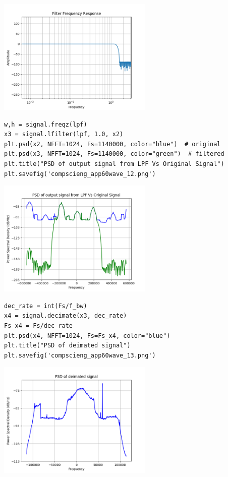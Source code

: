 \documentclass[12pt,fleqn]{article}\usepackage{../../common}
\begin{document}
\includegraphics[width=20em]{compscieng_app60wave_11.png}


\begin{verbatim}
w,h = signal.freqz(lpf)
x3 = signal.lfilter(lpf, 1.0, x2)
plt.psd(x2, NFFT=1024, Fs=1140000, color="blue")  # original
plt.psd(x3, NFFT=1024, Fs=1140000, color="green")  # filtered
plt.title("PSD of output signal from LPF Vs Original Signal")
plt.savefig('compscieng_app60wave_12.png')
\end{verbatim}

\includegraphics[width=20em]{compscieng_app60wave_12.png}

\begin{verbatim}
dec_rate = int(Fs/f_bw)
x4 = signal.decimate(x3, dec_rate)
Fs_x4 = Fs/dec_rate
plt.psd(x4, NFFT=1024, Fs=Fs_x4, color="blue")
plt.title("PSD of deimated signal")
plt.savefig('compscieng_app60wave_13.png')
\end{verbatim}

\includegraphics[width=20em]{compscieng_app60wave_13.png}
\end{document}
